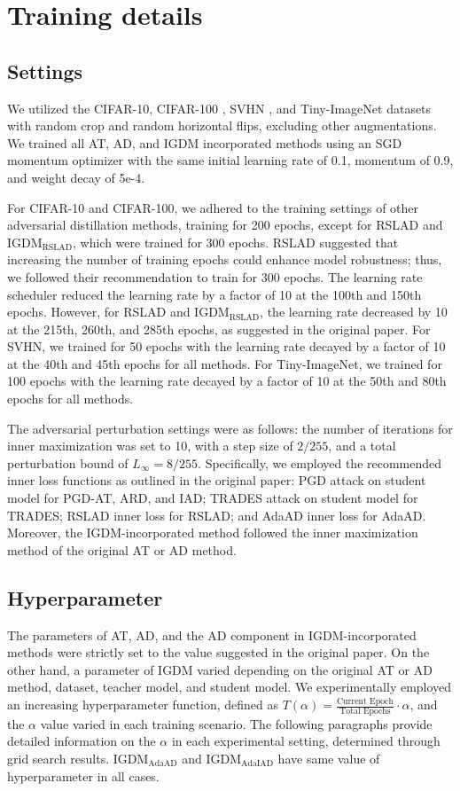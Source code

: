 \documentclass{article} %
\begin{document}
\section{Training details}
\label{sec:apendix_training_detail}
\subsection{Settings}
We utilized the CIFAR-10, CIFAR-100 \citep{krizhevsky2009learning}, SVHN \cite{svhn}, and Tiny-ImageNet \citep{le2015tiny} datasets with random crop and random horizontal flips, excluding other augmentations.
We trained all AT, AD, and IGDM incorporated methods using an SGD momentum optimizer with the same initial learning rate of 0.1, momentum of 0.9, and weight decay of 5e-4. 

For CIFAR-10 and CIFAR-100, we adhered to the training settings of other adversarial distillation methods, training for 200 epochs, except for RSLAD and IGDM$_{\text{RSLAD}}$, which were trained for 300 epochs. 
RSLAD suggested that increasing the number of training epochs could enhance model robustness; thus, we followed their recommendation to train for 300 epochs.
The learning rate scheduler reduced the learning rate by a factor of 10 at the 100th and 150th epochs. However, for RSLAD and IGDM$_{\text{RSLAD}}$, the learning rate decreased by 10 at the 215th, 260th, and 285th epochs, as suggested in the original paper. 
For SVHN, we trained for 50 epochs with the learning rate decayed by a factor of 10 at the 40th and 45th epochs for all methods. For Tiny-ImageNet, we trained for 100 epochs with the learning rate decayed by a factor of 10 at the 50th and 80th epochs for all methods.


The adversarial perturbation settings were as follows: the number of iterations for inner maximization was set to 10, with a step size of $2/255$, and a total perturbation bound of $L_\infty = 8/255$. 
Specifically, we employed the recommended inner loss functions as outlined in the original paper: PGD attack on student model for PGD-AT, ARD, and IAD; TRADES attack on student model for TRADES; RSLAD inner loss for RSLAD; and AdaAD inner loss for AdaAD.
Moreover, the IGDM-incorporated method followed the inner maximization method of the original AT or AD method.

\subsection{Hyperparameter}
The parameters of AT, AD, and the AD component in IGDM-incorporated methods were strictly set to the value suggested in the original paper.
On the other hand, a parameter of IGDM varied depending on the original AT or AD method, dataset, teacher model, and student model.
We experimentally employed an increasing hyperparameter function, defined as $T(\alpha) = \frac{\text{Current Epoch}}{\text{Total Epochs}}\cdot \alpha$, and the $\alpha$ value varied in each training scenario.
The following paragraphs provide detailed information on the $\alpha$ in each experimental setting, determined through grid search results.
IGDM$_{\text{AdaAD}}$ and IGDM$_{\text{AdaIAD}}$ have same value of hyperparameter in all cases.
\end{document}
